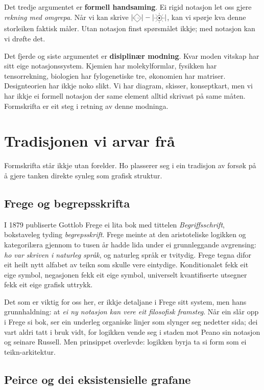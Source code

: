 \documentclass[a4paper,11pt]{article}
\newcommand{\lw}{line width=0.4pt,line cap=round,line join=round}
\newcommand{\gLyskjegle}[1][1]{%
  \begin{tikzpicture}[baseline=-0.5ex,scale=#1,\lw]
    \draw (0,0.2) -- (0.2,0) -- (0,-0.2) -- (-0.2,0) -- cycle;
    \draw[dashed,line width=0.22pt] (-0.2,0) -- (0.2,0);
  \end{tikzpicture}%
}
\newcommand{\gOmhug}[1][1]{%
  \begin{tikzpicture}[baseline=-0.5ex,scale=#1,\lw]
    \draw (0,0) circle (0.13);
    \fill (0,0) circle (0.04);
    \foreach \a in {0,45,90,135,180,225,270,315} {
      \draw[line width=0.32pt] (\a:0.18) -- (\a:0.25);
    }
  \end{tikzpicture}%
}
\begin{document}
Det tredje argumentet er \textbf{formell handsaming}. Ei rigid notasjon let oss gjere \emph{rekning med omgrepa}. Når vi kan skrive \(|\gLyskjegle| - |\gOmhug|\), kan vi spørje kva denne storleiken faktisk måler. Utan notasjon finst spørsmålet ikkje; med notasjon kan vi drøfte det.

Det fjerde og siste argumentet er \textbf{disiplinær modning}. Kvar moden vitskap har sitt eige notasjonssystem. Kjemien har molekylformlar, fysikken har tensorrekning, biologien har fylogenetiske tre, økonomien har matriser. Designteorien har ikkje noko slikt. Vi har diagram, skisser, konseptkart, men vi har ikkje ei formell notasjon der same element alltid skrivast på same måten. Formskrifta er eit steg i retning av denne modninga.


\section{Tradisjonen vi arvar frå}

Formskrifta står ikkje utan forelder. Ho plasserer seg i ein tradisjon av forsøk på å gjere tanken direkte synleg som grafisk struktur.

\subsection{Frege og begrepsskrifta}

I 1879 publiserte Gottlob Frege ei lita bok med tittelen \emph{Begriffsschrift}, bokstaveleg tyding \emph{begrepsskrift}. Frege meinte at den aristoteliske logikken og kategorilæra gjennom to tusen år hadde lida under ei grunnleggande avgrensing: \emph{ho var skriven i naturleg språk}, og naturleg språk er tvitydig. Frege tegna difor eit heilt nytt alfabet av teikn som skulle vere eintydige. Konditionalet fekk eit eige symbol, negasjonen fekk eit eige symbol, universelt kvantifiserte utsegner fekk eit eige grafisk uttrykk.

Det som er viktig for oss her, er ikkje detaljane i Frege sitt system, men hans grunnhaldning: at \emph{ei ny notasjon kan vere eit filosofisk framsteg}. Når ein slår opp i Frege si bok, ser ein underleg organiske linjer som slynger seg nedetter sida; dei vart aldri tatt i bruk vidt, for logikken vende seg i staden mot Peano sin notasjon og seinare Russell. Men prinsippet overlevde: logikken byrja ta si form som ei teikn-arkitektur.

\subsection{Peirce og dei eksistensielle grafane}
\end{document}
